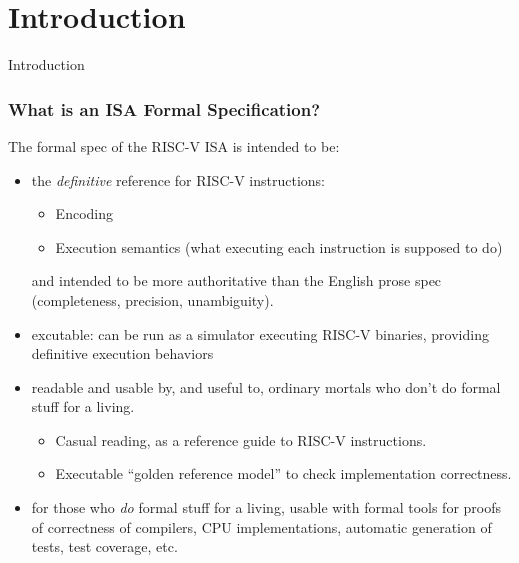 \documentclass[aspectratio=169]{beamer}
\newcommand{\slidefont}{\scriptsize}
\begin{document}
\section{Introduction}


\begin{frame}[fragile]

  \slidefont

  \vfill

  \begin{center}\LARGE
    Introduction
  \end{center}

  \vfill

\end{frame}


\begin{frame}[fragile]
  \frametitle{What is an ISA Formal Specification?}

  \slidefont

  \begin{block}{The formal spec of the RISC-V ISA is intended to be:}
    \begin{itemize}

      \item the \emph{definitive} reference for RISC-V instructions:
        \begin{itemize}\slidefont
          \item Encoding
          \item Execution semantics (what executing each instruction is supposed to do)
        \end{itemize}
        and intended to be more authoritative than the English prose
        spec (completeness, precision, unambiguity).

      \item excutable: can be run as a simulator executing RISC-V
        binaries, providing definitive execution behaviors

      \item readable and usable by, and useful to, ordinary mortals who don't do formal stuff for a living.
        \begin{itemize}\slidefont
          \item Casual reading, as a reference guide to RISC-V instructions.
          \item Executable ``golden reference model'' to check implementation correctness.
        \end{itemize}

      \item for those who \emph{do} formal stuff for a living, usable
        with formal tools for proofs of correctness of compilers, CPU
        implementations, automatic generation of tests, test coverage,
        etc.
    \end{itemize}
  \end{block}

\end{frame}
\end{document}
